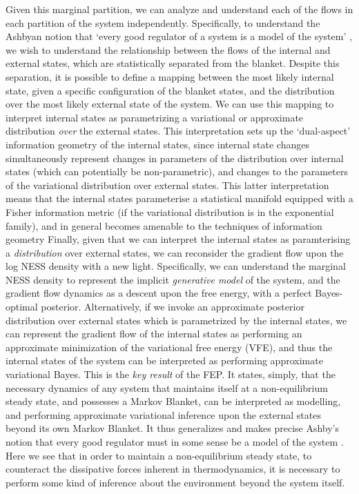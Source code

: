 Given this marginal partition, we can analyze and understand each of the flows in each partition of the system independently. Specifically, to understand the Ashbyan notion that `every good regulator of a system is a model of the system' , we wish to understand the relationship between the flows of the internal and external states, which are statistically separated from the blanket. Despite this separation, it is possible to define a mapping between the most likely internal state, given a specific configuration of the blanket states, and the distribution over the most likely external state of the system. We can use this mapping to interpret internal states as parametrizing a variational or approximate distribution \emph{over} the external states. This interpretation sets up the `dual-aspect' information geometry of the internal states, since internal state changes simultaneously represent changes in parameters of the distribution over internal states (which can potentially be non-parametric), and changes to the parameters of the variational distribution over external states. This latter interpretation means that the internal states parameterise a statistical manifold equipped with a Fisher information metric (if the variational distribution is in the exponential family), and in general becomes amenable to the techniques of information geometry \citep{amari1995information,ollivier2017information} Finally, given that we can interpret the internal states as paramterising a \emph{distribution} over external states, we can reconsider the gradient flow upon the log NESS density with a new light. Specifically, we can understand the marginal NESS density to represent the implicit \emph{generative model} of the system, and the gradient flow dynamics as a descent upon the free energy, with a perfect Bayes-optimal posterior. Alternatively, if we invoke an approximate posterior distribution over external states which is parametrized by the internal states, we can represent the gradient flow of the internal states as performing an approximate minimization of the variational free energy (VFE), and thus the internal states of the system can be interpreted as performing approximate variational Bayes. This is the \emph{key result} of the FEP. It states, simply, that the necessary dynamics of any system that maintains itself at a non-equilibrium steady state, and possesses a Markov Blanket, can be interpreted as modelling, and performing approximate variational inference upon the external states beyond its own Markov Blanket. It thus generalizes and makes precise Ashby's notion that every good regulator must in some sense be a model of the system \citep{conant1970every}. Here we see that in order to maintain a non-equilibrium steady state, to counteract the dissipative forces inherent in thermodynamics, it is necessary to perform some kind of inference about the environment beyond the system itself. 

